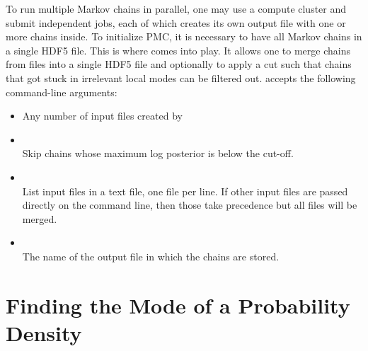 To run multiple Markov chains in parallel, one may use a compute cluster and submit
independent jobs, each of which creates its own output file with one or more
chains inside. To initialize PMC, it is necessary to have all Markov chains in a
single HDF5 file. This is where  comes into play. It
allows one to merge chains from files into a single HDF5 file and optionally to
apply a cut such that chains that got stuck in irrelevant local modes can be
filtered out.
 accepts the following command-line arguments:
\begin{itemize}
    \item[] Any number of input files created by \\[-3\medskipamount]
    \item[] \\[\medskipamount]
        Skip chains whose maximum log posterior is below the cut-off.

    \item[] \\[\medskipamount]
        List input files in a text file, one file per line. If other input files are passed directly on the command line, then those take precedence but all files will be merged.

    \item[] \\[\medskipamount]
        The name of the output file in which the chains are stored.
\end{itemize}

\section{Finding the Mode of a Probability Density}
\label{sec:usage:eos-find-mode}

